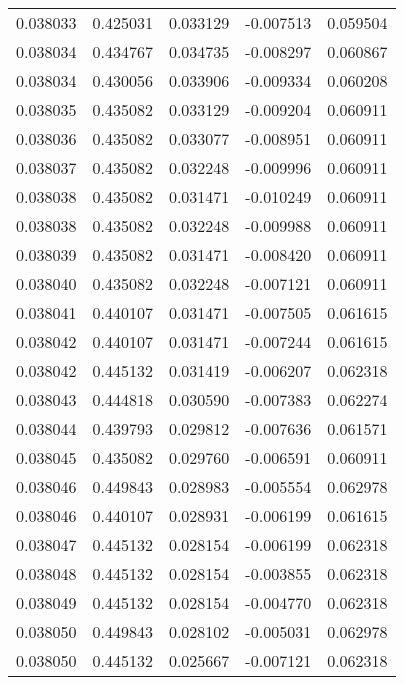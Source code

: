 \begin{tabular}{lrrrr}
0.038033    &  0.425031 &  0.033129 & -0.007513 &             0.059504 \\
0.038034    &  0.434767 &  0.034735 & -0.008297 &             0.060867 \\
0.038034    &  0.430056 &  0.033906 & -0.009334 &             0.060208 \\
0.038035    &  0.435082 &  0.033129 & -0.009204 &             0.060911 \\
0.038036    &  0.435082 &  0.033077 & -0.008951 &             0.060911 \\
0.038037    &  0.435082 &  0.032248 & -0.009996 &             0.060911 \\
0.038038    &  0.435082 &  0.031471 & -0.010249 &             0.060911 \\
0.038038    &  0.435082 &  0.032248 & -0.009988 &             0.060911 \\
0.038039    &  0.435082 &  0.031471 & -0.008420 &             0.060911 \\
0.038040    &  0.435082 &  0.032248 & -0.007121 &             0.060911 \\
0.038041    &  0.440107 &  0.031471 & -0.007505 &             0.061615 \\
0.038042    &  0.440107 &  0.031471 & -0.007244 &             0.061615 \\
0.038042    &  0.445132 &  0.031419 & -0.006207 &             0.062318 \\
0.038043    &  0.444818 &  0.030590 & -0.007383 &             0.062274 \\
0.038044    &  0.439793 &  0.029812 & -0.007636 &             0.061571 \\
0.038045    &  0.435082 &  0.029760 & -0.006591 &             0.060911 \\
0.038046    &  0.449843 &  0.028983 & -0.005554 &             0.062978 \\
0.038046    &  0.440107 &  0.028931 & -0.006199 &             0.061615 \\
0.038047    &  0.445132 &  0.028154 & -0.006199 &             0.062318 \\
0.038048    &  0.445132 &  0.028154 & -0.003855 &             0.062318 \\
0.038049    &  0.445132 &  0.028154 & -0.004770 &             0.062318 \\
0.038050    &  0.449843 &  0.028102 & -0.005031 &             0.062978 \\
0.038050    &  0.445132 &  0.025667 & -0.007121 &             0.062318 \\

\end{tabular}
